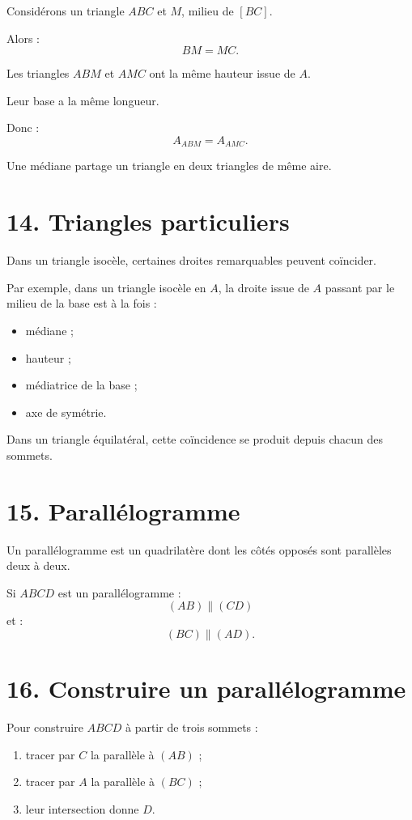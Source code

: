 Considérons un triangle $ABC$ et $M$, milieu de $[BC]$.

Alors :
\[
BM=MC.
\]

Les triangles $ABM$ et $AMC$ ont la même hauteur issue de $A$.

Leur base a la même longueur.

Donc :
\[
A_{ABM}=A_{AMC}.
\]

\begin{propriete}
Une médiane partage un triangle en deux triangles de même aire.
\end{propriete}

\section{14. Triangles particuliers}

Dans un triangle isocèle, certaines droites remarquables peuvent coïncider.

Par exemple, dans un triangle isocèle en $A$, la droite issue de $A$ passant par le milieu de la base est à la fois :
\begin{itemize}
\item médiane ;
\item hauteur ;
\item médiatrice de la base ;
\item axe de symétrie.
\end{itemize}

Dans un triangle équilatéral, cette coïncidence se produit depuis chacun des sommets.

\section{15. Parallélogramme}

\begin{definition}
Un parallélogramme est un quadrilatère dont les côtés opposés sont parallèles deux à deux.
\end{definition}

Si $ABCD$ est un parallélogramme :
\[
(AB)\parallel(CD)
\]
et :
\[
(BC)\parallel(AD).
\]

\section{16. Construire un parallélogramme}

Pour construire $ABCD$ à partir de trois sommets :
\begin{enumerate}
\item tracer par $C$ la parallèle à $(AB)$ ;
\item tracer par $A$ la parallèle à $(BC)$ ;
\item leur intersection donne $D$.
\end{enumerate}

